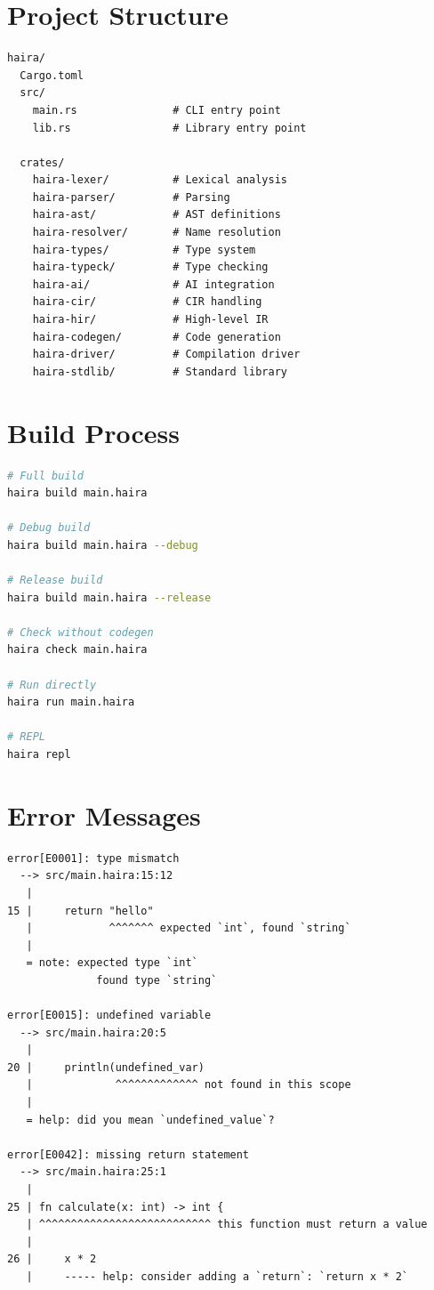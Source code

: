 \section{Project Structure}

\begin{lstlisting}[language={},numbers=none]
haira/
  Cargo.toml
  src/
    main.rs               # CLI entry point
    lib.rs                # Library entry point

  crates/
    haira-lexer/          # Lexical analysis
    haira-parser/         # Parsing
    haira-ast/            # AST definitions
    haira-resolver/       # Name resolution
    haira-types/          # Type system
    haira-typeck/         # Type checking
    haira-ai/             # AI integration
    haira-cir/            # CIR handling
    haira-hir/            # High-level IR
    haira-codegen/        # Code generation
    haira-driver/         # Compilation driver
    haira-stdlib/         # Standard library
\end{lstlisting}

\section{Build Process}

\begin{lstlisting}[language=bash,numbers=none]
# Full build
haira build main.haira

# Debug build
haira build main.haira --debug

# Release build
haira build main.haira --release

# Check without codegen
haira check main.haira

# Run directly
haira run main.haira

# REPL
haira repl
\end{lstlisting}

\section{Error Messages}

\begin{lstlisting}[language={},numbers=none]
error[E0001]: type mismatch
  --> src/main.haira:15:12
   |
15 |     return "hello"
   |            ^^^^^^^ expected `int`, found `string`
   |
   = note: expected type `int`
              found type `string`

error[E0015]: undefined variable
  --> src/main.haira:20:5
   |
20 |     println(undefined_var)
   |             ^^^^^^^^^^^^^ not found in this scope
   |
   = help: did you mean `undefined_value`?

error[E0042]: missing return statement
  --> src/main.haira:25:1
   |
25 | fn calculate(x: int) -> int {
   | ^^^^^^^^^^^^^^^^^^^^^^^^^^^ this function must return a value
   |
26 |     x * 2
   |     ----- help: consider adding a `return`: `return x * 2`
\end{lstlisting}

